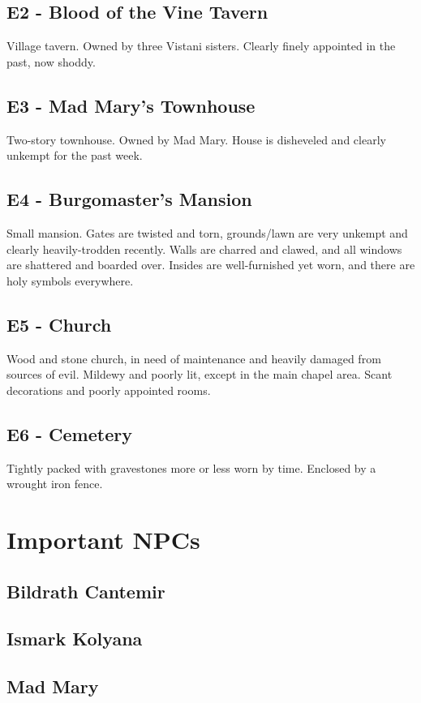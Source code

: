 \documentclass[a4paper,11pt]{article}
\begin{document}
\subsection{E2 - Blood of the Vine Tavern}
  Village tavern. Owned by three Vistani sisters. Clearly finely appointed in the past, now shoddy.
\subsection{E3 - Mad Mary's Townhouse}
  Two-story townhouse. Owned by Mad Mary. House is disheveled and clearly unkempt for the past week.
\subsection{E4 - Burgomaster's Mansion}
  Small mansion. Gates are twisted and torn, grounds/lawn are very unkempt and clearly heavily-trodden recently.
  Walls are charred and clawed, and all windows are shattered and boarded over. Insides are well-furnished yet
  worn, and there are holy symbols everywhere.
\subsection{E5 - Church}
  Wood and stone church, in need of maintenance and heavily damaged from sources of evil. Mildewy and poorly 
  lit, except in the main chapel area. Scant decorations and poorly appointed rooms.
\subsection{E6 - Cemetery}
  Tightly packed with gravestones more or less worn by time. Enclosed by a wrought iron fence.

\pagebreak
\section{Important NPCs}
\label{sec:ImportantNPCs}
\subsection{Bildrath Cantemir}
  
\subsection{Ismark Kolyana}
\subsection{Mad Mary}
\end{document}

